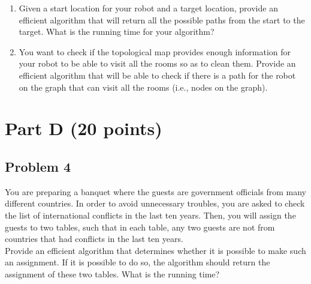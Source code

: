 \documentclass[11pt]{article}
\begin{document}
\begin{enumerate}[label=\Alph*.]

\item Given a start location for your robot and a target
location, provide an efficient algorithm that will return all the
possible paths from the start to the target.  What is the running time
for your algorithm?

\item You want to check if the topological map provides
enough information for your robot to be able to visit all the rooms so
as to clean them. Provide an efficient algorithm that will be able to
check if there is a path for the robot on the graph that can visit all
the rooms (i.e., nodes on the graph).
\end{enumerate}

\section*{Part D (20 points)}

\subsection*{Problem 4} You are preparing a banquet where the
guests are government officials from many different countries. In
order to avoid unnecessary troubles, you are asked to check the list
of international conflicts in the last ten years. Then, you will
assign the guests to two tables, such that in each table, any two
guests are not from countries that had conflicts in the last ten
years.\\

\noindent Provide an efficient algorithm that determines whether it is
possible to make such an assignment. If it is possible to do so, the
algorithm should return the assignment of these two tables. What is
the running time?
\end{document}
